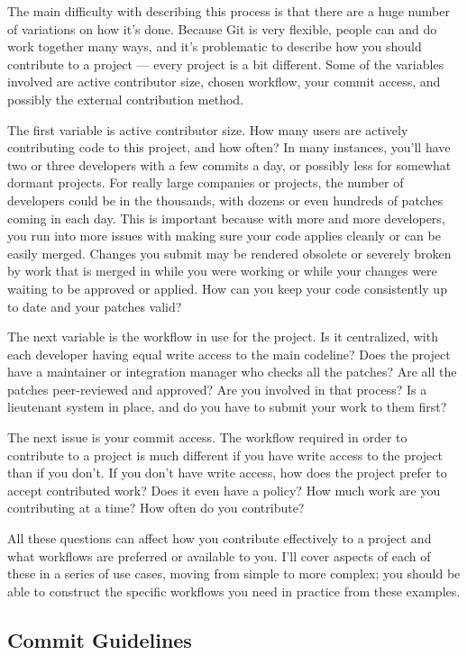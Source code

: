 \documentclass[a4paper]{book}
\begin{document}
The main difficulty with describing this process is that there are a huge number of variations on how it's done. Because Git is very flexible, people can and do work together many ways, and it's problematic to describe how you should contribute to a project --- every project is a bit different. Some of the variables involved are active contributor size, chosen workflow, your commit access, and possibly the external contribution method.

The first variable is active contributor size. How many users are actively contributing code to this project, and how often? In many instances, you'll have two or three developers with a few commits a day, or possibly less for somewhat dormant projects. For really large companies or projects, the number of developers could be in the thousands, with dozens or even hundreds of patches coming in each day. This is important because with more and more developers, you run into more issues with making sure your code applies cleanly or can be easily merged. Changes you submit may be rendered obsolete or severely broken by work that is merged in while you were working or while your changes were waiting to be approved or applied. How can you keep your code consistently up to date and your patches valid?

The next variable is the workflow in use for the project. Is it centralized, with each developer having equal write access to the main codeline? Does the project have a maintainer or integration manager who checks all the patches? Are all the patches peer-reviewed and approved? Are you involved in that process? Is a lieutenant system in place, and do you have to submit your work to them first?

The next issue is your commit access. The workflow required in order to contribute to a project is much different if you have write access to the project than if you don't. If you don't have write access, how does the project prefer to accept contributed work? Does it even have a policy? How much work are you contributing at a time? How often do you contribute?

All these questions can affect how you contribute effectively to a project and what workflows are preferred or available to you. I'll cover aspects of each of these in a series of use cases, moving from simple to more complex; you should be able to construct the specific workflows you need in practice from these examples.

\subsection{Commit Guidelines}\label{commit-guidelines}
\end{document}
